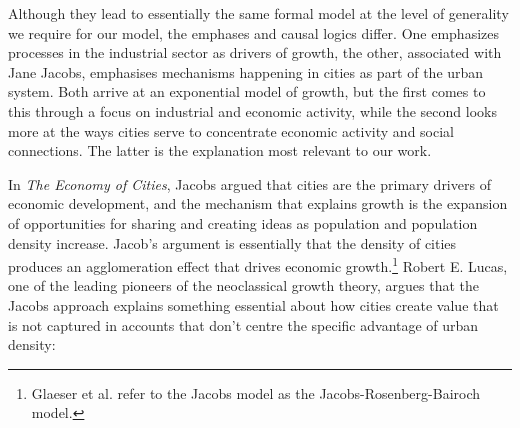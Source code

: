 

Although they lead to essentially the same formal model at the level of generality we require for our model, %
the emphases and causal logics differ. One emphasizes processes in the industrial sector as drivers of growth, the other, associated with Jane Jacobs, emphasises mechanisms happening in cities as part of the urban system. %
Both arrive at an exponential model of growth, but the first comes to this through a focus on industrial and economic activity, while the second looks more at the ways cities serve to concentrate economic activity and social connections. The latter is the explanation most relevant to our work.

In \textit{The Economy of Cities}, Jacobs \cite{jacobsEconomyCities1969} argued that %
cities are the primary drivers of economic development, and the mechanism that explains growth is the expansion of opportunities for sharing and creating ideas as population and population density increase. Jacob's argument is essentially that the density of cities produces an agglomeration effect that drives economic growth.\footnote{Glaeser et al. \cite{glaeserGrowthCities1991} refer to the Jacobs model as the Jacobs-Rosenberg-Bairoch \cite{bairochCitiesEconomicDevelopment1988, rosenbergTechnologicalChangeMachine1963} model.} %
Robert E. Lucas, one of the leading pioneers of the neoclassical growth theory, argues that the Jacobs approach explains something essential about how cities create value that is not captured in accounts that don't centre the specific advantage of urban density: %

